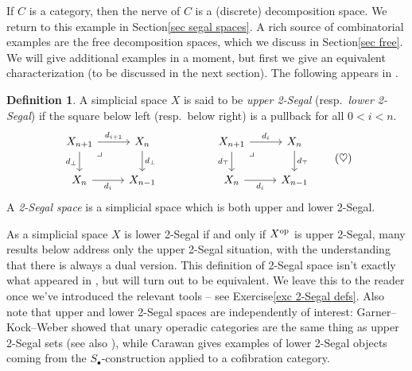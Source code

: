 \documentclass{amsart}
\theoremstyle{definition}
\newtheorem{definition}[theorem]{Definition}
\theoremstyle{remark}
\newcommand{\op}{\textup{op}}
\begin{document}
If $C$ is a category, then the nerve of $C$ is a (discrete) decomposition space.
We return to this example in Section\nobreakspace \ref {sec segal spaces}.
A rich source of combinatorial examples are the free decomposition spaces, which we discuss in Section\nobreakspace \ref {sec free}.
We will give additional examples in a moment, but first we give an equivalent characterization (to be discussed in the next section).
The following appears in \cite{Feller_et_al:E2SSU}.

\begin{definition}\label{def 2-segal}
A simplicial space $X$ is said to be \emph{upper 2-Segal} (resp.\ \emph{lower 2-Segal}) if the square below left (resp.\ below right) is a pullback for all $0 < i < n$.
\begin{equation} \label{eq upper and lower 2-Segal} \begin{tikzcd}
X_{n+1} \rar{d_{i+1}} \dar[swap]{d_\bot} \ar[dr, phantom, "\lrcorner" very near start] & X_n \dar{d_\bot} 
& & 
X_{n+1} \rar{d_i} \dar[swap]{d_\top} \ar[dr, phantom, "\lrcorner" very near start] & X_n \dar{d_\top}
\\
X_n \rar[swap]{d_i} & X_{n-1}
& & 
X_n \rar[swap]{d_i} & X_{n-1}
\end{tikzcd} 
\tag{$\heartsuit$}
\end{equation}
A \emph{2-Segal space} is a simplicial space which is both upper and lower 2-Segal.
\end{definition}

As a simplicial space $X$ is lower 2-Segal if and only if $X^\op$ is upper 2-Segal, many results below address only the upper 2-Segal situation, with the understanding that there is always a dual version.
This definition of 2-Segal space isn't exactly what appeared in \cite{Stern:BIRS}, but will turn out to be equivalent.
We leave this to the reader once we've introduced the relevant tools --
see Exercise\nobreakspace \ref {exc 2-Segal defs}.
Also note that upper and lower 2-Segal spaces are independently of interest: Garner--Kock--Weber \cite{GarnerKockWeber:OCD} showed that unary operadic categories are the same thing as upper 2-Segal sets (see also \cite{Hackney:OC2SS}), while Carawan \cite{Carawan:2SMACWC} gives examples of lower 2-Segal objects coming from the $S_\bullet$-construction applied to a cofibration category.
\end{document}

